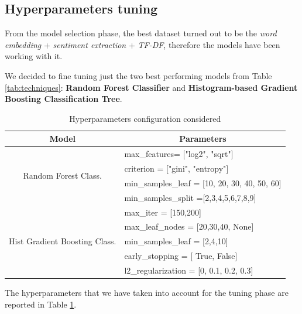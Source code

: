 \documentclass[conference]{IEEEtran}
\begin{document}
\subsection{Hyperparameters tuning}\label{sec:hypertuning}
From the model selection phase, the best dataset turned out to be the \textit{ word embedding} + \textit{sentiment extraction} + \textit{TF-DF}, therefore the models have been working with it.

We decided to fine tuning just the two best performing models from Table \ref{tab:techniques}: \textbf{Random Forest Classifier} and \textbf{Histogram-based Gradient Boosting Classification Tree}.
\begin{table}[h]
\begin{tabular}{@{}ll@{}}
\toprule
\multicolumn{1}{c}{\textbf{Model}}                        & \multicolumn{1}{c}{\textbf{Parameters}}           \\ \midrule
\multicolumn{1}{c}{\multirow{4}{*}{Random Forest Class.}} & max\_features= {[}"log2", "sqrt"{]}               \\
\multicolumn{1}{c}{}                                      & criterion = {[}"gini", "entropy"{]}               \\
\multicolumn{1}{c}{}                                      & min\_samples\_leaf = {[}10, 20, 30, 40, 50, 60{]} \\
\multicolumn{1}{c}{}                                      & min\_samples\_split ={[}2,3,4,5,6,7,8,9{]}        \\ \midrule
\multirow{5}{*}{Hist Gradient Boosting Class.}            & max\_iter = {[}150,200{]}                         \\
                                                          & max\_leaf\_nodes = {[}20,30,40, None{]}           \\
                                                          & min\_samples\_leaf = {[}2,4,10{]}                 \\
                                                          & early\_stopping = {[} True, False{]}              \\
                                                          & l2\_regularization = {[}0, 0.1, 0.2, 0.3{]}       \\ \bottomrule
\end{tabular}
\caption{Hyperparameters configuration considered}
\label{tab:hypertuning}
\end{table}
The hyperparameters that we have taken into account for the tuning phase are reported in Table \ref{tab:hypertuning}.
\end{document}
